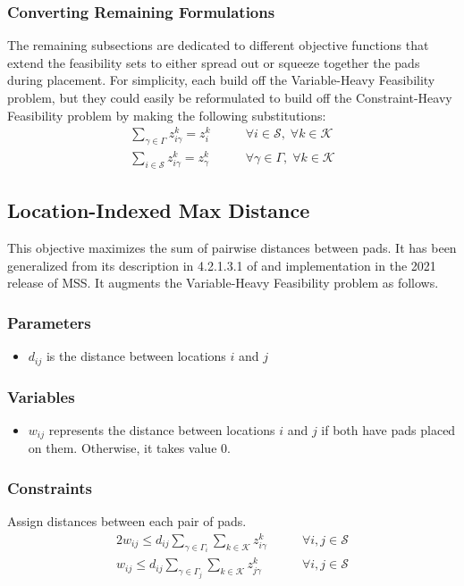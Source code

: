 \documentclass[10pt]{article}
\begin{document}
	\subsubsection{Converting Remaining Formulations}
	The remaining subsections are dedicated to different objective functions that extend the feasibility sets to either spread out or squeeze together the pads during placement. For simplicity, each build off the Variable-Heavy Feasibility problem, but they could easily be reformulated to build off the Constraint-Heavy Feasibility problem by making the following substitutions:
	\begin{align*}
		\sum_{\gamma \in \Gamma} z_{i\gamma}^k = z_i^k &\qquad \forall i \in \mathcal{S}, \; \forall k \in \mathcal{K} \\
		\sum_{i \in \mathcal{S}} z_{i\gamma}^k = z_\gamma^k &\qquad \forall \gamma \in \Gamma, \; \forall k \in \mathcal{K}
	\end{align*}

	\subsection{Location-Indexed Max Distance}
	This objective maximizes the sum of pairwise distances between pads. It has been generalized from its description in 4.2.1.3.1 of \cite{ruby} and implementation in the 2021 release of MSS. It augments the Variable-Heavy Feasibility problem as follows.
	
	\subsubsection{Parameters}
	\begin{itemize}
		\item $d_{ij}$ is the distance between locations $ i $ and $ j $
	\end{itemize}
	
	\subsubsection{Variables}
	\begin{itemize}
		\item $ w_{ij} $ represents the distance between locations $ i $ and $ j $ if both have pads placed on them. Otherwise, it takes value 0.
	\end{itemize}
	
	\subsubsection{Constraints}
	\noindent Assign distances between each pair of pads.
	\begin{alignat}{2}
		w_{ij} \leq d_{ij} \sum_{\gamma \in \Gamma_i} \sum_{k \in \mathcal{K}} z_{i\gamma}^k & \qquad \forall i, j \in \mathcal{S} \\
		w_{ij} \leq d_{ij} \sum_{\gamma \in \Gamma_j} \sum_{k \in \mathcal{K}} z_{j\gamma}^k & \qquad \forall i, j \in \mathcal{S}
	\end{alignat}
\end{document}
